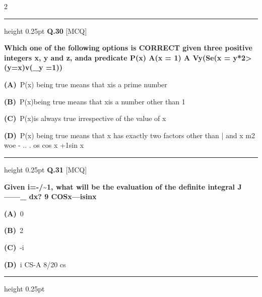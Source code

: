 \documentclass[a4paper,10pt,twoside]{article}
\begin{document}
\begin{multicols}{2}
\par\vspace{6pt}\hrule height 0.25pt\vspace{6pt}
\noindent\textbf{Q.30} \hfill {\footnotesize\textsf{[MCQ]}}
\par\vspace{2pt}
{\bfseries Which one of the following options is CORRECT given three positive integers x, y and z, anda
predicate
P(x) A(x = 1) A Vy(Se(x = y*2>(y=x)v(\_y =1)) \par}
\par\vspace{2pt}\noindent
\textbf{(A)}~P(x) being true means that xis a prime number\par\vspace{2pt}\noindent
\textbf{(B)}~P(x)being true means that xis a number other than 1\par\vspace{2pt}\noindent
\textbf{(C)}~P(x)is always true irrespective of the value of x\par\vspace{2pt}\noindent
\textbf{(D)}~P(x) being true means that x has exactly two factors other than | and x \newline m2 woe \newline - .. . os cos x +1sin x
\par\vspace{6pt}\hrule height 0.25pt\vspace{6pt}
\noindent\textbf{Q.31} \hfill {\footnotesize\textsf{[MCQ]}}
\par\vspace{2pt}
{\bfseries Given i=-/\~{}1, what will be the evaluation of the definite integral J ------\_ dx?
9 COSx---isinx \par}
\par\vspace{2pt}\noindent
\textbf{(A)}~0\par\vspace{2pt}\noindent
\textbf{(B)}~2\par\vspace{2pt}\noindent
\textbf{(C)}~-i\par\vspace{2pt}\noindent
\textbf{(D)}~i \newline CS-A 8/20  cs
\par\vspace{6pt}\hrule height 0.25pt\vspace{6pt}

\end{multicols}
\end{document}
